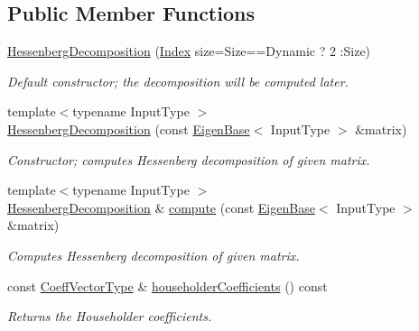 \subsection*{Public Member Functions}
\begin{DoxyCompactItemize}
\item 
\mbox{\hyperlink{class_eigen_1_1_hessenberg_decomposition_aee1724cb6418ede1a8b9045036a5a319}{Hessenberg\+Decomposition}} (\mbox{\hyperlink{class_eigen_1_1_hessenberg_decomposition_a8e287ac222f53e2c8ce82faa43e95ac6}{Index}} size=Size==Dynamic ? 2 \+:Size)
\begin{DoxyCompactList}\small\item\em Default constructor; the decomposition will be computed later. \end{DoxyCompactList}\item 
{\footnotesize template$<$typename Input\+Type $>$ }\\\mbox{\hyperlink{class_eigen_1_1_hessenberg_decomposition_acd22602a3e3e5a02f79990ba1e445dc9}{Hessenberg\+Decomposition}} (const \mbox{\hyperlink{struct_eigen_1_1_eigen_base}{Eigen\+Base}}$<$ Input\+Type $>$ \&matrix)
\begin{DoxyCompactList}\small\item\em Constructor; computes Hessenberg decomposition of given matrix. \end{DoxyCompactList}\item 
{\footnotesize template$<$typename Input\+Type $>$ }\\\mbox{\hyperlink{class_eigen_1_1_hessenberg_decomposition}{Hessenberg\+Decomposition}} \& \mbox{\hyperlink{class_eigen_1_1_hessenberg_decomposition_a239a6fd42c57aab3c0b048c47fde3004}{compute}} (const \mbox{\hyperlink{struct_eigen_1_1_eigen_base}{Eigen\+Base}}$<$ Input\+Type $>$ \&matrix)
\begin{DoxyCompactList}\small\item\em Computes Hessenberg decomposition of given matrix. \end{DoxyCompactList}\item 
const \mbox{\hyperlink{class_eigen_1_1_hessenberg_decomposition_a567f99f3770365777b67bf9832b6fac1}{Coeff\+Vector\+Type}} \& \mbox{\hyperlink{class_eigen_1_1_hessenberg_decomposition_a65fa81ce79d956baa59a30a6d82f8a84}{householder\+Coefficients}} () const
\begin{DoxyCompactList}\small\item\em Returns the Householder coefficients. \end{DoxyCompactList}\item 

\end{DoxyCompactItemize}
